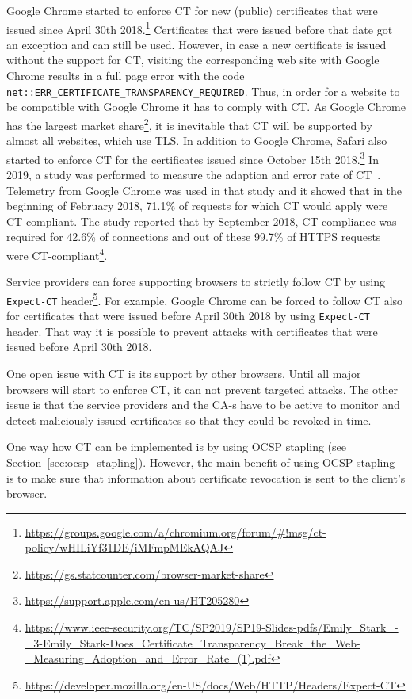 Google Chrome started to enforce CT for new (public) certificates that were issued since April 30th  2018.\footnote{\url{https://groups.google.com/a/chromium.org/forum/\#!msg/ct-policy/wHILiYf31DE/iMFmpMEkAQAJ}} Certificates that were issued before that date got an exception and can still be used. However, in case a new certificate is issued without the support for CT, visiting the corresponding web site with Google Chrome results in a full page error with the code \texttt{net::ERR\_CERTIFICATE\_TRANSPARENCY\_REQUIRED}. Thus, in order for a website to be compatible with Google Chrome it has to comply with CT. As Google Chrome has the largest market share\footnote{\url{https://gs.statcounter.com/browser-market-share}}, it is inevitable that CT will be supported by almost all websites, which use TLS. In addition to Google Chrome, Safari also started to enforce CT for the certificates issued since October 15th  2018.\footnote{\url{https://support.apple.com/en-us/HT205280}} In 2019, a study was performed to measure the adaption and error rate of CT~\cite{DBLP:conf/sp/StarkSMOMFMT19}. Telemetry from Google Chrome was used in that study and it showed that in the beginning of February 2018, 71.1\% of requests for which CT would apply were CT-compliant. The study reported that by September 2018, CT-compliance was required for 42.6\% of connections and out of these 99.7\% of HTTPS requests were CT-compliant\footnote{\url{https://www.ieee-security.org/TC/SP2019/SP19-Slides-pdfs/Emily_Stark_-_3-Emily_Stark-Does_Certificate_Transparency_Break_the_Web-_Measuring_Adoption_and_Error_Rate_(1).pdf}}.

Service providers can force supporting browsers to strictly follow CT by using \texttt{Expect-CT} header\footnote {\url{https://developer.mozilla.org/en-US/docs/Web/HTTP/Headers/Expect-CT}}. For example, Google Chrome can be forced to follow CT also for certificates that were issued before April 30th 2018 by using \texttt{Expect-CT} header. That way it is possible to prevent attacks with certificates that were issued before April 30th 2018.

One open issue with CT is its support by other browsers. Until all major browsers will start to enforce CT, it can not prevent targeted attacks. The other issue is that the service providers and the CA-s have to be active to monitor and detect maliciously issued certificates so that they could be revoked in time.

One way how CT can be implemented is by using OCSP stapling (see Section~\ref{sec:ocsp_stapling}). However, the main benefit of using OCSP stapling is to make sure that information about certificate revocation is sent to the client's browser.



